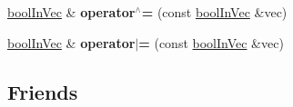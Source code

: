 \begin{DoxyCompactItemize}
\item 
\mbox{\label{classVectormath_1_1boolInVec_a2cecb71816be3684641a448310a92312}} 
\hyperlink{classVectormath_1_1boolInVec}{bool\+In\+Vec} \& {\bfseries operator$^\wedge$=} (const \hyperlink{classVectormath_1_1boolInVec}{bool\+In\+Vec} \&vec)
\item 
\mbox{\label{classVectormath_1_1boolInVec_a5070334ac06df1190ee5c414478b3b3e}} 
\hyperlink{classVectormath_1_1boolInVec}{bool\+In\+Vec} \& {\bfseries operator$\vert$=} (const \hyperlink{classVectormath_1_1boolInVec}{bool\+In\+Vec} \&vec)
\end{DoxyCompactItemize}
\subsection*{Friends}
